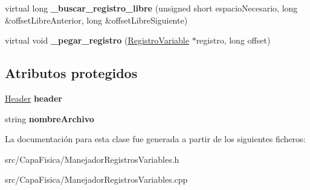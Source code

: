 \begin{DoxyCompactItemize}
\item 
\hypertarget{class_manejador_registros_variables_a7d1677c5cb42c343005fae9f86520d6b}{virtual long {\bfseries \-\_\-buscar\-\_\-registro\-\_\-libre} (unsigned short espacio\-Necesario, long \&offset\-Libre\-Anterior, long \&offset\-Libre\-Siguiente)}\label{class_manejador_registros_variables_a7d1677c5cb42c343005fae9f86520d6b}

\item 
\hypertarget{class_manejador_registros_variables_ac12dbed942d2e529060bae9377cd3804}{virtual void {\bfseries \-\_\-pegar\-\_\-registro} (\hyperlink{class_registro_variable}{\-Registro\-Variable} $\ast$registro, long offset)}\label{class_manejador_registros_variables_ac12dbed942d2e529060bae9377cd3804}

\end{DoxyCompactItemize}
\subsection*{\-Atributos protegidos}
\begin{DoxyCompactItemize}
\item 
\hypertarget{class_manejador_registros_variables_a7dcb8d2eb5568b79d966191905ae5961}{\hyperlink{struct_manejador_registros_variables_1_1_header}{\-Header} {\bfseries header}}\label{class_manejador_registros_variables_a7dcb8d2eb5568b79d966191905ae5961}

\item 
\hypertarget{class_manejador_registros_variables_a2d9f452b9d24eec24bd61cb59aed00b3}{string {\bfseries nombre\-Archivo}}\label{class_manejador_registros_variables_a2d9f452b9d24eec24bd61cb59aed00b3}

\end{DoxyCompactItemize}


\-La documentación para esta clase fue generada a partir de los siguientes ficheros\-:\begin{DoxyCompactItemize}
\item 
src/\-Capa\-Fisica/\-Manejador\-Registros\-Variables.\-h\item 
src/\-Capa\-Fisica/\-Manejador\-Registros\-Variables.\-cpp\end{DoxyCompactItemize}
